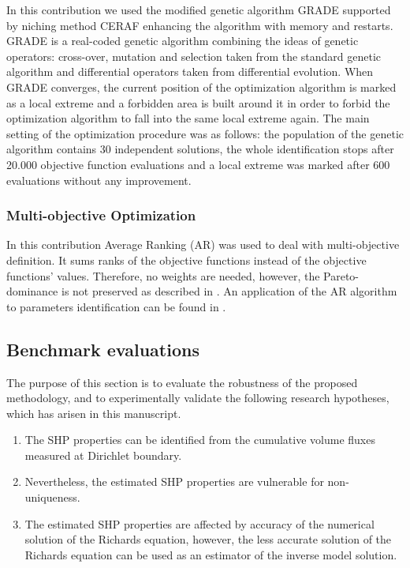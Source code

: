 \documentclass[review]{elsarticle}
\begin{document}
In this contribution we used the modified genetic algorithm GRADE \citep{grade,Kucerova:2007:PHD} supported by niching method CERAF \citep{Hrstka} enhancing the algorithm with
memory and restarts. GRADE is a real-coded genetic algorithm combining the ideas of genetic operators: cross-over, mutation and selection taken from the standard genetic algorithm and differential operators taken from differential evolution. When GRADE converges, the current position of the optimization algorithm is marked as a local extreme and a forbidden area is built around it in order to forbid the optimization algorithm to fall into the same local extreme again. The main setting of the optimization procedure was as follows: the population of the genetic algorithm contains 30 independent solutions, the whole identification stops after 20.000 objective function evaluations and a local extreme was marked after 600 evaluations without any improvement.


\subsubsection{Multi-objective Optimization}

 In this contribution Average Ranking (AR) \citep{Leps:2007} was used to deal with multi-objective definition. It sums ranks of the objective functions instead of the objective functions' values. Therefore, no weights are needed, however, the Pareto-dominance is not preserved as described in \cite{vitingerova:2010}. An application of the AR algorithm to parameters identification can be found in \cite{Kuraz:2010:JCAM}. 
 
 \subsection{Benchmark evaluations}
 \label{benchmarks}
 
The purpose of this section is to evaluate the robustness of the proposed methodology, and to experimentally validate the following  research hypotheses, which has arisen   in this manuscript.
\begin{enumerate}
\item The SHP properties can be identified from the cumulative volume fluxes measured at Dirichlet boundary. 
\item Nevertheless, the estimated SHP properties are vulnerable for non-uniqueness.
\item The estimated SHP properties are affected by accuracy of the numerical solution of the Richards equation, however, the less accurate solution of the Richards equation can be used as an estimator of the inverse model solution.
\end{enumerate}
\end{document}
